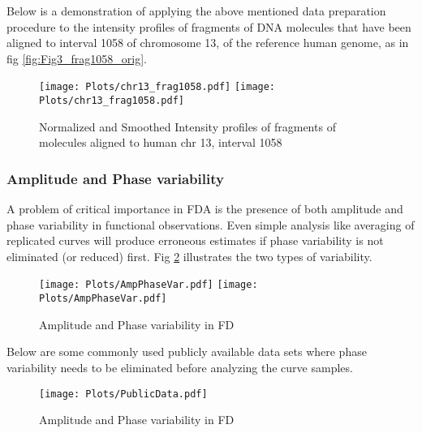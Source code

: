 Below is a demonstration of applying the above mentioned data preparation procedure to the intensity profiles of fragments of DNA molecules that have been aligned to interval 1058 of chromosome 13, of the reference human genome, as in fig \ref{fig:Fig3_frag1058_orig}.
\begin{figure}[H]
\begin{center}
\texttt{[image: Plots/chr13\_frag1058.pdf]}
\texttt{[image: Plots/chr13\_frag1058.pdf]}
\end{center}
\caption{Normalized and Smoothed Intensity profiles of fragments of molecules aligned to human chr 13, interval 1058}
\label{fig:Fig3_frag1058_norm}
\end{figure}


\subsubsection{Amplitude and Phase variability} \label{Sec_AmpPhase}
A problem of critical importance in FDA is the presence of both amplitude and phase variability in functional observations. Even simple analysis like averaging of replicated curves will produce erroneous estimates if phase variability is not eliminated (or reduced) first. Fig \ref{fig:Fig3_AmpPhase} illustrates the two types of variability. 
\begin{figure}[H]
\begin{center}
\texttt{[image: Plots/AmpPhaseVar.pdf]}
\texttt{[image: Plots/AmpPhaseVar.pdf]}
\end{center}
\caption{Amplitude and Phase variability in FD}
\label{fig:Fig3_AmpPhase}
\end{figure}
Below are some commonly used publicly available data sets where phase variability needs to be eliminated before analyzing the curve samples. 
\begin{figure}[H]
\begin{center}
\texttt{[image: Plots/PublicData.pdf]}
\end{center}
\caption{Amplitude and Phase variability in FD}
\label{fig:Fig3_growthM}
\end{figure}

